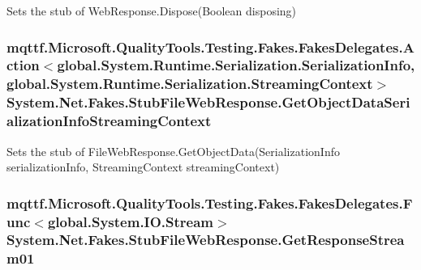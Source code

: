 Sets the stub of Web\-Response.\-Dispose(\-Boolean disposing)

\hypertarget{class_system_1_1_net_1_1_fakes_1_1_stub_file_web_response_ae30e7d4dde452d1f097224732ceb0d8b}{
\subsubsection[{Get\-Object\-Data\-Serialization\-Info\-Streaming\-Context}]{\setlength{\rightskip}{0pt plus 5cm}mqttf.\-Microsoft.\-Quality\-Tools.\-Testing.\-Fakes.\-Fakes\-Delegates.\-Action$<$global.\-System.\-Runtime.\-Serialization.\-Serialization\-Info, global.\-System.\-Runtime.\-Serialization.\-Streaming\-Context$>$ System.\-Net.\-Fakes.\-Stub\-File\-Web\-Response.\-Get\-Object\-Data\-Serialization\-Info\-Streaming\-Context}}\label{class_system_1_1_net_1_1_fakes_1_1_stub_file_web_response_ae30e7d4dde452d1f097224732ceb0d8b}


Sets the stub of File\-Web\-Response.\-Get\-Object\-Data(\-Serialization\-Info serialization\-Info, Streaming\-Context streaming\-Context)

\hypertarget{class_system_1_1_net_1_1_fakes_1_1_stub_file_web_response_a14e07419076bea9fcb16c938caf30f43}{
\subsubsection[{Get\-Response\-Stream01}]{\setlength{\rightskip}{0pt plus 5cm}mqttf.\-Microsoft.\-Quality\-Tools.\-Testing.\-Fakes.\-Fakes\-Delegates.\-Func$<$global.\-System.\-I\-O.\-Stream$>$ System.\-Net.\-Fakes.\-Stub\-File\-Web\-Response.\-Get\-Response\-Stream01}}\label{class_system_1_1_net_1_1_fakes_1_1_stub_file_web_response_a14e07419076bea9fcb16c938caf30f43}


